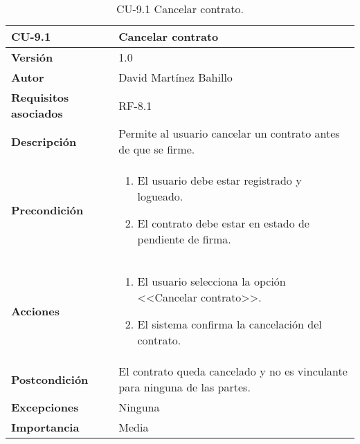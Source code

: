 \begin{table}[p]
	\centering
	\begin{tabularx}{\linewidth}{ p{} p{} }
		\toprule
		\textbf{CU-9.1}  & \textbf{Cancelar contrato}\\
		\midrule
		\textbf{Versión}              & 1.0    \\
		\textbf{Autor}                & David Martínez Bahillo \\
		\textbf{Requisitos asociados} & RF-8.1 \\
		\textbf{Descripción}          & Permite al usuario cancelar un contrato antes de que se firme. \\
		\textbf{Precondición}         &  
		\begin{enumerate}
			\item El usuario debe estar registrado y logueado.
			\item El contrato debe estar en estado de pendiente de firma.
		\end{enumerate}\\
		\textbf{Acciones}             &
		\begin{enumerate}
			\item El usuario selecciona la opción <<Cancelar contrato>>.
			\item El sistema confirma la cancelación del contrato.
		\end{enumerate}\\
		\textbf{Postcondición}        & El contrato queda cancelado y no es vinculante para ninguna de las partes. \\
		\textbf{Excepciones}          & Ninguna \\
		\textbf{Importancia}          & Media \\
		\bottomrule
	\end{tabularx}
	\caption{CU-9.1 Cancelar contrato.}
\end{table}


